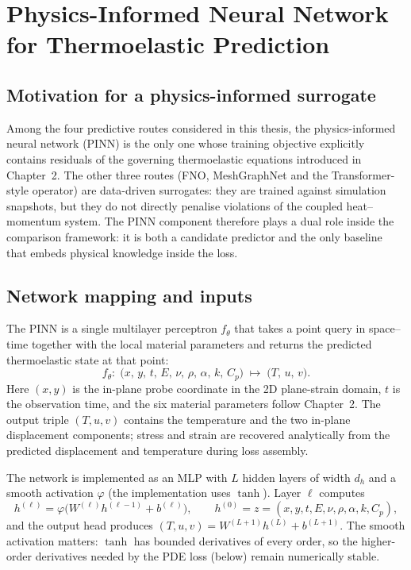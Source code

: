 \section{Physics-Informed Neural Network for Thermoelastic Prediction}

\subsection{Motivation for a physics-informed surrogate}

Among the four predictive routes considered in this thesis, the
physics-informed neural network (PINN) is the only one whose training
objective explicitly contains residuals of the governing thermoelastic
equations introduced in Chapter~2. The other three routes (FNO,
MeshGraphNet and the Transformer-style operator) are data-driven
surrogates: they are trained against simulation snapshots, but they do
not directly penalise violations of the coupled heat--momentum system.
The PINN component therefore plays a dual role inside the comparison
framework: it is both a candidate predictor and the only baseline that
embeds physical knowledge inside the loss.

\subsection{Network mapping and inputs}

The PINN is a single multilayer perceptron $f_{\theta}$ that takes a
point query in space--time together with the local material parameters
and returns the predicted thermoelastic state at that point:
\begin{equation}
f_{\theta}\colon\; 
\bigl(x,\,y,\,t,\,E,\,\nu,\,\rho,\,\alpha,\,k,\,C_p\bigr)
\;\longmapsto\;
\bigl(T,\,u,\,v\bigr).
\end{equation}
Here $(x,y)$ is the in-plane probe coordinate in the 2D plane-strain
domain, $t$ is the observation time, and the six material parameters
follow Chapter~2. The output triple $(T,u,v)$ contains the
temperature and the two in-plane displacement components; stress and
strain are recovered analytically from the predicted displacement and
temperature during loss assembly.

The network is implemented as an MLP with $L$ hidden layers of width
$d_h$ and a smooth activation $\varphi$ (the implementation uses
$\tanh$). Layer $\ell$ computes
\begin{equation}
h^{(\ell)} = \varphi\bigl(W^{(\ell)} h^{(\ell-1)} + b^{(\ell)}\bigr),
\qquad
h^{(0)} = z = (x,y,t,E,\nu,\rho,\alpha,k,C_p),
\end{equation}
and the output head produces
$(T,u,v) = W^{(L+1)} h^{(L)} + b^{(L+1)}$.
The smooth activation matters: $\tanh$ has bounded derivatives of
every order, so the higher-order derivatives needed by the PDE loss
(below) remain numerically stable.

